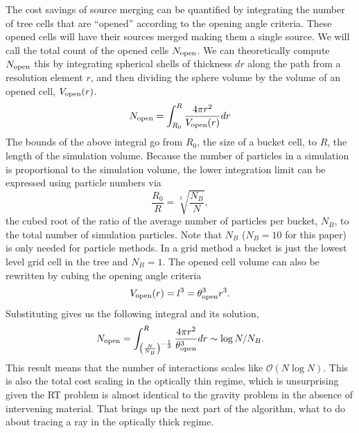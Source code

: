 \documentclass[fleq,usenatbib]{mnras}
\newcommand{\bigO}[1]{\mathcal{O}\left(#1\right)}
\newcommand{\tO}{\theta_{\rm open}}
\begin{document}
The cost savings of source merging can be quantified by integrating the number 
of tree cells that are ``opened'' according to the opening angle criteria. 
These opened cells will have their sources merged making them a single source. 
We will call the total count of the opened cells $N_{\rm open}$. We can 
theoretically compute $N_{\rm open}$ this by integrating spherical shells of 
thickness $dr$ along the path from a resolution element $r$, and then dividing 
the sphere volume by the volume of an opened cell, $V_{\rm open}(r)$.
\begin{equation}
\label{eqn:nsint}
N_{\rm open} = \int_{R_0}^R \frac{4\pi r^2}{V_{\rm open}(r)} dr
\end{equation}
The bounds of the above integral go from $R_0$, the size of a bucket 
cell, to $R$, the length of the simulation volume. Because the number of 
particles in a simulation is proportional to the simulation volume, the 
lower integration limit can be expressed using particle numbers via 
\begin{equation}
\label{eqn:ratio}
\frac{R_0}{R} = \sqrt[3]{\frac{N_B}{N}},
\end{equation} 
the cubed root of the ratio of the average number of particles per bucket, 
$N_B$, to the total number of simulation particles. Note that $N_B$ 
($N_B = 10$ for this paper) is only needed for particle methods. In a grid 
method a bucket is just the lowest level grid cell in the tree and $N_B=1$. 
The opened cell volume can also be rewritten by cubing the opening angle 
criteria
\begin{equation}
\label{eqn:vcell}
V_{\rm open}(r) = l^3 = \tO^3 r^3.
\end{equation}
Substituting gives us the following integral and its solution,
\begin{equation}
\label{eqn:nssoln}
N_{\rm open} = \int_{\left(\frac{N}{N_B}\right)^{-\frac{1}{3}}}^R 
\frac{4\pi r^2}{\tO^3} dr
\sim \log{N/N_B}.
\end{equation}
This result means that the number of interactions scales like 
$\bigO{N \log N}$. This is also the total cost scaling in the optically 
thin regime, which is unsurprising given the RT problem is almost identical to 
the gravity problem in the absence of intervening material. That brings up the 
next part of the algorithm, what to do about tracing a ray in the optically 
thick regime.
\end{document}
